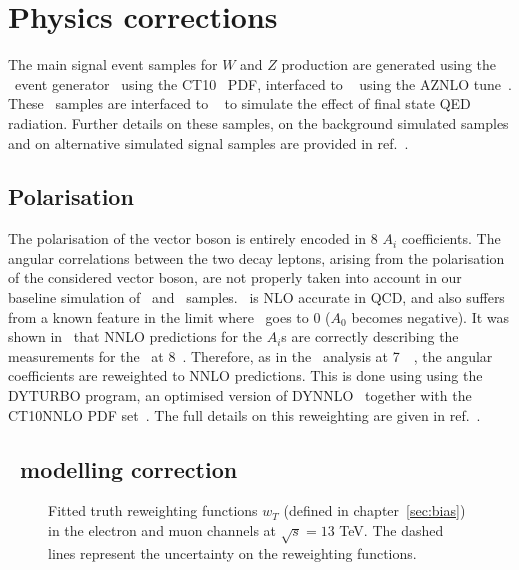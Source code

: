 
\section{Physics corrections}
\label{sec:physcorr}

The main signal event samples for $W$ and $Z$ production are generated
using the \POWHEG\ event
generator~\cite{Nason_2004,Frixione_2007,Alioli_2008,Alioli_2010}
using the CT10~\cite{guzzi2011ct10} PDF, interfaced to ~\cite{pythia} using the
AZNLO tune~\cite{STDM-2012-23}. These \POWPYTHIA\ samples are interfaced
to \Photos~\cite{Golonka:2005pn} to simulate the effect of final state
QED radiation. Further details on these samples, on the background simulated samples and on alternative simulated signal samples are provided in ref.~\cite{Kretzschmar:2657141}.
%

\subsection{Polarisation}

The polarisation of the vector boson is entirely encoded in 8 $A_i$ coefficients.
The angular correlations between the two decay leptons, arising from the polarisation of the considered vector boson, are not properly taken into account in our baseline simulation of \Wboson\ and \Zboson\ samples.
\POWHEG\ is NLO accurate in QCD, and also suffers from a known feature in the limit where \pttruthv\ goes to 0 ($A_0$ becomes negative). It was shown in~\cite{Aad_2016} that NNLO predictions for the $A_i$s are correctly describing the measurements for the \Zboson\ at 8~\TeV. Therefore, as in the \mW\ analysis at 7~\TeV~\cite{Aaboud:2017svj}, the angular coefficients are reweighted to NNLO predictions. This is done using using the DYTURBO program, an optimised version
of DYNNLO~\cite{Catani:2007vq,Catani:2009sm} together with the CT10NNLO PDF
set~\cite{Gao_2014}. The full details on this reweighting are given in ref.~\cite{Kretzschmar:2657141}.
%

\subsection{\pt\ modelling correction}
\label{sec:physcorrWpTrew}

\begin{figure}[h]
  \centering
  \caption{Fitted truth reweighting functions $w_{T}$ (defined in chapter~\ref{sec:bias}) in the electron and muon channels at $\sqrt{s}=13$ TeV. The dashed lines represent the uncertainty on the reweighting functions.}
  \label{fig:rewFuncBiasCorr13TeV}
\end{figure}

